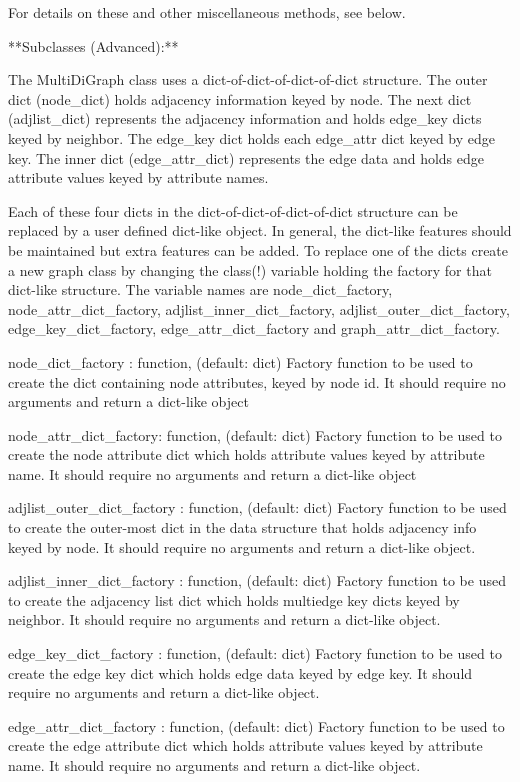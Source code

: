 \begin{DoxyVerb}
For details on these and other miscellaneous methods, see below.

**Subclasses (Advanced):**

The MultiDiGraph class uses a dict-of-dict-of-dict-of-dict structure.
The outer dict (node_dict) holds adjacency information keyed by node.
The next dict (adjlist_dict) represents the adjacency information and holds
edge_key dicts keyed by neighbor. The edge_key dict holds each edge_attr
dict keyed by edge key. The inner dict (edge_attr_dict) represents
the edge data and holds edge attribute values keyed by attribute names.

Each of these four dicts in the dict-of-dict-of-dict-of-dict
structure can be replaced by a user defined dict-like object.
In general, the dict-like features should be maintained but
extra features can be added. To replace one of the dicts create
a new graph class by changing the class(!) variable holding the
factory for that dict-like structure. The variable names are
node_dict_factory, node_attr_dict_factory, adjlist_inner_dict_factory,
adjlist_outer_dict_factory, edge_key_dict_factory, edge_attr_dict_factory
and graph_attr_dict_factory.

node_dict_factory : function, (default: dict)
    Factory function to be used to create the dict containing node
    attributes, keyed by node id.
    It should require no arguments and return a dict-like object

node_attr_dict_factory: function, (default: dict)
    Factory function to be used to create the node attribute
    dict which holds attribute values keyed by attribute name.
    It should require no arguments and return a dict-like object

adjlist_outer_dict_factory : function, (default: dict)
    Factory function to be used to create the outer-most dict
    in the data structure that holds adjacency info keyed by node.
    It should require no arguments and return a dict-like object.

adjlist_inner_dict_factory : function, (default: dict)
    Factory function to be used to create the adjacency list
    dict which holds multiedge key dicts keyed by neighbor.
    It should require no arguments and return a dict-like object.

edge_key_dict_factory : function, (default: dict)
    Factory function to be used to create the edge key dict
    which holds edge data keyed by edge key.
    It should require no arguments and return a dict-like object.

edge_attr_dict_factory : function, (default: dict)
    Factory function to be used to create the edge attribute
    dict which holds attribute values keyed by attribute name.
    It should require no arguments and return a dict-like object.


\end{DoxyVerb}
